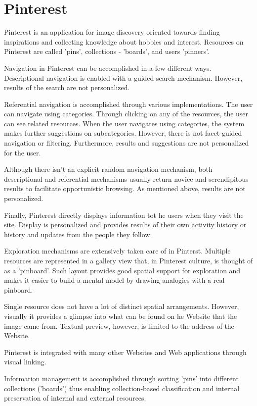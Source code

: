 {\section{Pinterest}
Pinterest is an application for image discovery oriented towards finding inspirations and collecting knowledge about hobbies and interest. Resources on Pinterest are called 'pins', collections - 'boards', and users 'pinners'. 

Navigation in Pinterest can be accomplished in a few different ways. Descriptional navigation is enabled with a guided search mechanism. However, results of the search are not personalized. 

Referential navigation is accomplished through various implementations. The user can navigate using categories. Through clicking on any of the resources, the user can see related resources. When the user navigates using categories, the system makes further suggestions on subcategories. However, there is not facet-guided navigation or filtering. Furthermore, results and suggestions are not personalized for the user. 

Although there isn't an explicit random navigation mechanism, both descriptional and referential mechanisms usually return novice and serendipitous results to facilitate opportunistic browsing. As mentioned above, results are not personalized.

Finally, Pinterest directly displays information tot he users when they visit the site. Display is personalized and provides results of their own activity history or history and updates from the people they follow.

Exploration mechanisms are extensively taken care of in Pinterst. Multiple resources are represented in a gallery view that, in Pinterest culture, is thought of as a 'pinboard'. Such layout provides good spatial support for exploration and makes it easier to build a mental model by drawing analogies with a real pinboard. 

Single resource does not have a lot of distinct spatial arrangements. However, visually it provides a glimpse into what can be found on he Website that the image came from. Textual preview, however, is limited to the address of the Website.

Pinterest is integrated with many other Websites and Web applications through visual linking.

Information management is accomplished through sorting 'pins' into different collections ('boards') thus enabling collection-based classification and internal preservation of internal and external resources. 

}
